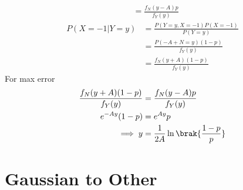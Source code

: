 \documentclass[journal,12pt,twocolumn]{IEEEtran}
\renewcommand\thesection{\arabic{section}}
\begin{document}
\begin{enumerate}[label=\thesection.\arabic*
    ,ref=\thesection.\theenumi]
\begin{align}
    &= \frac{f_N(y-A)p}{f_Y(y)}
\end{align}
\begin{align}
    P(X = -1|Y = y) &= \frac{P(Y = y, X = -1)P(X =-1)}{P(Y=y)}\\
    &= \frac{P(-A+N=y)(1-p)}{f_Y(y)}\\
    &= \frac{f_N(y+A)(1-p)}{f_Y(y)}
\end{align}
For max error
\begin{align}
    \frac{f_N(y+A)(1-p)}{f_Y(y)} &=  \frac{f_N(y-A)p}{f_Y(y)}\\
    e^{-Ay}(1-p) &=  e^{Ay}p\\
    \implies y &= \frac{1}{2A}\ln\brak{\frac{1-p}{p}} 
\end{align}
\end{enumerate}
\section{Gaussian to Other}
\end{document}
